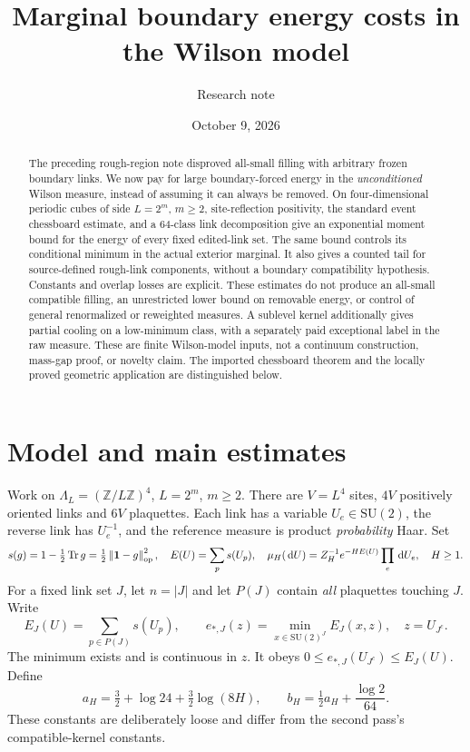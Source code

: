 \documentclass[11pt]{article}
\title{Marginal boundary energy costs in the Wilson model}
\author{Research note}
\date{October 9, 2026}
\theoremstyle{remark}
\newcommand{\one}{\mathbf 1}
\newcommand{\Tr}{\operatorname{Tr}}
\newcommand{\dd}{\,\mathrm d}
\newcommand{\SU}{\mathrm{SU}(2)}
\newcommand{\norm}[1]{\left\lVert#1\right\rVert}
\begin{document}
\maketitle
\begin{abstract}
The preceding rough-region note disproved all-small filling with arbitrary
frozen boundary links. We now pay for large boundary-forced energy in the
\emph{unconditioned} Wilson measure, instead of assuming it can always be
removed. On four-dimensional periodic cubes of side $L=2^m$, $m\ge2$,
site-reflection positivity, the standard event chessboard estimate, and a
64-class link decomposition give an exponential moment bound for the energy
of every fixed edited-link set. The same bound controls its conditional
minimum in the actual exterior marginal. It also gives a counted tail for
source-defined rough-link components, without a boundary compatibility
hypothesis. Constants and overlap losses are explicit. These estimates do
not produce an all-small compatible filling, an unrestricted lower bound
on removable energy, or control of general renormalized or reweighted measures. A sublevel kernel additionally gives partial cooling on a low-minimum
class, with a separately paid exceptional label in the raw measure.
These are finite Wilson-model inputs, not a continuum construction, mass-gap proof, or novelty
claim. The imported chessboard theorem and the locally proved geometric
application are distinguished below.
\end{abstract}
\tableofcontents

\section{Model and main estimates}
Work on $\Lambda_L=(\mathbb Z/L\mathbb Z)^4$, $L=2^m$, $m\ge2$.
There are $V=L^4$ sites, $4V$ positively oriented links and $6V$ plaquettes.
Each link has a variable $U_e\in\SU$, the reverse link has $U_e^{-1}$,
and the reference measure is product \emph{probability} Haar. Set
\[
 s(g)=1-\tfrac12\Tr g=\tfrac12\norm{\one-g}_{\rm op}^2,
 \quad E(U)=\sum_p s(U_p),\quad
 \mu_H(\dd U)=Z_H^{-1}e^{-HE(U)}\prod_e\dd U_e,\quad H\ge1.
\]
For a fixed link set $J$, let $n=|J|$ and let $P(J)$ contain \emph{all}
plaquettes touching $J$. Write
\[
 E_J(U)=\sum_{p\in P(J)}s(U_p),\qquad
 e_{*,J}(z)=\min_{x\in\SU^J}E_J(x,z),\quad z=U_{J^c}.
\]
The minimum exists and is continuous in $z$. It obeys
$0\le e_{*,J}(U_{J^c})\le E_J(U)$. Define
\begin{equation}
 a_H=\tfrac32+\log24+\tfrac32\log(8H),\qquad
 b_H=\tfrac12a_H+\frac{\log2}{64}.
 \label{eq:constants}
\end{equation}
These constants are deliberately loose and differ from the second pass's
compatible-kernel constants.
\end{document}
